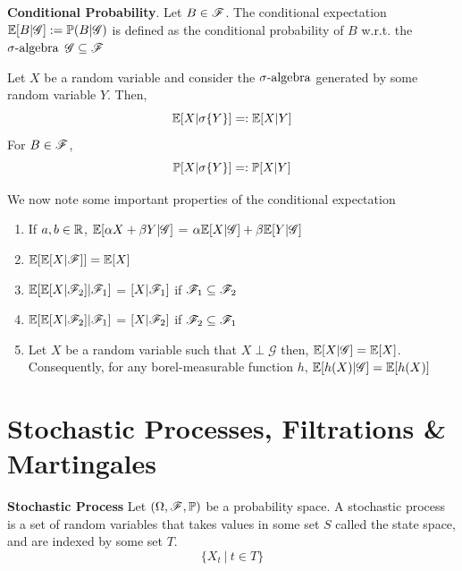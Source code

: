 \documentclass[../TGMAFFIRO.tex]{subfiles}
\begin{document}
\begin{definition}\textbf{Conditional Probability}.
	Let $B\in\mathscr{F}$. The conditional expectation $\mathbb{E}[B | \mathscr{G}] := \mathbb{P}(B | \mathscr{G})$ is defined as the conditional probability of $B$ w.r.t. the $\sigma\text{-algebra}$ $\mathscr{G} \subseteq \mathscr{F}$
\end{definition}

\begin{definition}
	Let $X$ be a random variable and consider the $\sigma\text{-algebra}$ generated by some random variable $Y$. Then,
	\begin{equation}
		\mathbb{E}[X | \sigma\{Y\}] =: \mathbb{E}[X | Y]
	\end{equation}
	For $B \in \mathscr{F}$,
	\begin{equation}
		\mathbb{P}[X | \sigma\{Y\}] =: \mathbb{P}[X | Y]
	\end{equation}
\end{definition}

\begin{proposition}
	We now note some important properties of the conditional expectation
	\begin{enumerate}
		\item If $a, b \in \mathbb{R}$, $\mathbb{E}[\alpha X + \beta Y | \mathscr{G}]$ = $\alpha \mathbb{E}[X | \mathscr{G}] + \beta\mathbb{E}[Y | \mathscr{G}]$
		\item $\mathbb{E}[\mathbb{E}[X | \mathscr{F}]] = \mathbb{E}[X]$
		\item $\mathbb{E}[\mathbb{E}[X | \mathscr{F}_2] | \mathscr{F}_1]$ = $[X | \mathscr{F}_1]$ if $\mathscr{F}_1 \subseteq \mathscr{F}_2$
		\item $\mathbb{E}[\mathbb{E}[X | \mathscr{F}_2] | \mathscr{F}_1]$ = $[X | \mathscr{F}_2]$ if $\mathscr{F}_2 \subseteq \mathscr{F}_1$
		\item Let $X$ be a random variable such that $X \perp \mathscr{G}$ then, $\mathbb{E}[X|\mathscr{G}] = \mathbb{E}[X]$. Consequently, for any borel-measurable function $h$, $\mathbb{E}[h(X)|\mathscr{G}] = \mathbb{E}[h(X)]$
	\end{enumerate}
\end{proposition}


\section{Stochastic Processes, Filtrations \& Martingales}

\begin{definition}\textbf{Stochastic Process}
	Let $(\Omega, \mathscr{F}, \mathbb{P})$ be a probability space. A stochastic process is a set of random variables that takes values in some set $S$ called the state space, and are indexed by some set $T$.
	\begin{equation}
		\{X_t \ | \ t \in T\}
	\end{equation}
\end{definition}
\end{document}
